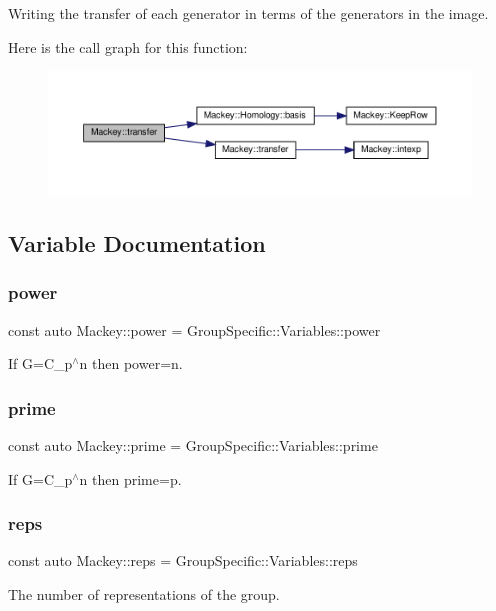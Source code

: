 Writing the transfer of each generator in terms of the generators in the image. 

Here is the call graph for this function\+:\nopagebreak
\begin{figure}[H]
\begin{center}
\leavevmode
\includegraphics[width=350pt]{namespaceMackey_a3f20cf0ccf7d280f6a6e308c381dc350_cgraph}
\end{center}
\end{figure}


\subsection{Variable Documentation}
\mbox{\label{namespaceMackey_aafdaaabd06dd9ceefe6fa4f26d13a60d}} 
\subsubsection{\texorpdfstring{power}{power}}
{\footnotesize\ttfamily const auto Mackey\+::power = Group\+Specific\+::\+Variables\+::power}



If G=C\+\_\+p$^\wedge$n then power=n. 

\mbox{\label{namespaceMackey_a77e059c6f9b4c6ea096fcf94a7880bc3}} 
\subsubsection{\texorpdfstring{prime}{prime}}
{\footnotesize\ttfamily const auto Mackey\+::prime = Group\+Specific\+::\+Variables\+::prime}



If G=C\+\_\+p$^\wedge$n then prime=p. 

\mbox{\label{namespaceMackey_af282e8433677f2812cb242359f4cd0c1}} 
\subsubsection{\texorpdfstring{reps}{reps}}
{\footnotesize\ttfamily const auto Mackey\+::reps = Group\+Specific\+::\+Variables\+::reps}



The number of representations of the group. 

